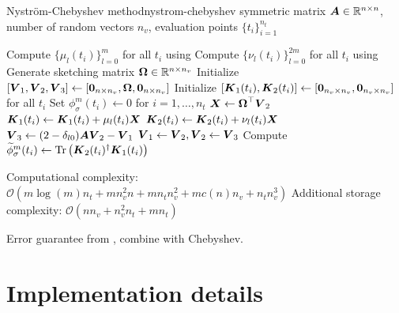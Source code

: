 \begin{algo}{Nystr\"om-Chebyshev method}{nystrom-chebyshev}
    symmetric matrix $\boldsymbol{A} \in \mathbb{R}^{n \times n}$, number of random vectors $n_v$,
    evaluation points $\{t_i\}_{i=1}^{n_t}$
    \begin{algorithmic}[1]
        \State Compute $\{\mu_l(t_i)\}_{l=0}^m$ for all $t_i$ using 
        \State Compute $\{\nu_l(t_i)\}_{l=0}^{2m}$ for all $t_i$ using 
        \State Generate sketching matrix $\boldsymbol{\Omega} \in \mathbb{R}^{n \times n_v}$ %
        \State Initialize $[\boldsymbol{V}_1, \boldsymbol{V}_2, \boldsymbol{V}_3] \gets [\boldsymbol{0}_{n \times n_v}, \boldsymbol{\Omega}, \boldsymbol{0}_{n \times n_v}]$
        \State Initialize $[\boldsymbol{K}_1(t_i), \boldsymbol{K}_2(t_i)] \gets [\boldsymbol{0}_{n_v \times n_v}, \boldsymbol{0}_{n_v \times n_v}]$ for all $t_i$
        \State Set ${\phi}_{\sigma}^m(t_i) \gets 0$ for $i=1,\dots,n_t$
          \State $\boldsymbol{X} \gets \boldsymbol{\Omega}^{\top} \boldsymbol{V}_2$
                \State $\boldsymbol{K}_1(t_i) \gets \boldsymbol{K}_1(t_i) + \mu_l(t_i) \boldsymbol{X}$
            \EndIf
            \State $\boldsymbol{K}_2(t_i) \gets \boldsymbol{K}_2(t_i) + \nu_l(t_i) \boldsymbol{X}$
          \EndFor
          \State $\boldsymbol{V}_3 \gets (2 - \delta_{l0}) \boldsymbol{A} \boldsymbol{V}_2 - \boldsymbol{V}_1$ 
          \State $\boldsymbol{V}_1 \gets \boldsymbol{V}_2, \boldsymbol{V}_2 \gets \boldsymbol{V}_3$
        \EndFor
          \State Compute $\widetilde{\phi}_{\sigma}^m(t_i) \gets \operatorname{Tr}\left( \boldsymbol{K}_2(t_i)^{\dagger}\boldsymbol{K}_1(t_i) \right)$
        \EndFor
    \end{algorithmic}
\end{algo}

Computational complexity: $\mathcal{O}(m \log(m) n_t + m n_v^2 n + m n_t n_v^2 +  m c(n) n_v + n_t n_v^3)$
Additional storage complexity: $\mathcal{O}(n n_v + n_v^2 n_t + m n_t)$

Error guarantee from \cite[Theorem~9]{kressner2023randomized}, combine with Chebyshev.


\section{Implementation details}
\label{sec:3-nystrom-implementation-details}

